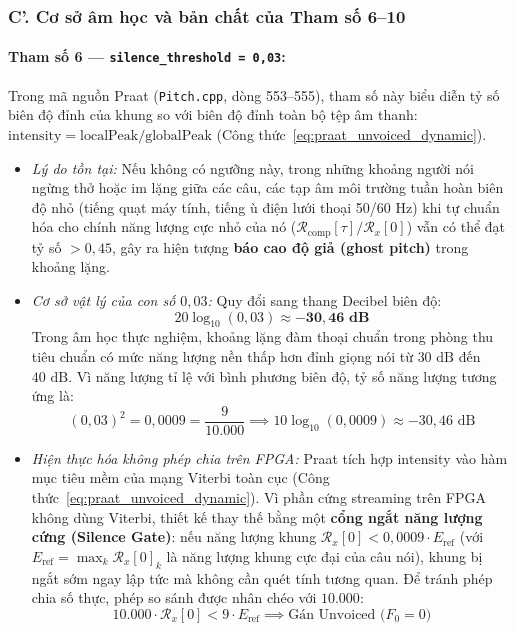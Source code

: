 \documentclass[11pt,a4paper]{article}
\begin{document}
\subsubsection*{C'. Cơ sở âm học và bản chất của Tham số 6--10}

\paragraph{Tham số 6 --- \texttt{silence\_threshold = 0,03}:}
Trong mã nguồn Praat (\texttt{Pitch.cpp}, dòng 553--555), tham số này biểu diễn tỷ số biên độ đỉnh của khung so với biên độ đỉnh toàn bộ tệp âm thanh: $\text{intensity} = \text{localPeak} / \text{globalPeak}$ (Công thức~\ref{eq:praat_unvoiced_dynamic}).
\begin{itemize}
    \setlength{\itemsep}{1pt}
    \item \emph{Lý do tồn tại:} Nếu không có ngưỡng này, trong những khoảng người nói ngừng thở hoặc im lặng giữa các câu, các tạp âm môi trường tuần hoàn biên độ nhỏ (tiếng quạt máy tính, tiếng ù điện lưới thoại 50/60 Hz) khi tự chuẩn hóa cho chính năng lượng cực nhỏ của nó ($\mathcal{R}_{\text{comp}}[\tau] / \mathcal{R}_x[0]$) vẫn có thể đạt tỷ số $> 0{,}45$, gây ra hiện tượng \textbf{báo cao độ giả (ghost pitch)} trong khoảng lặng.
    \item \emph{Cơ sở vật lý của con số $0{,}03$:} Quy đổi sang thang Decibel biên độ:
    \[
    20 \log_{10}(0{,}03) \approx \mathbf{-30{,}46\text{ dB}}
    \]
    Trong âm học thực nghiệm, khoảng lặng đàm thoại chuẩn trong phòng thu tiêu chuẩn có mức năng lượng nền thấp hơn đỉnh giọng nói từ $30\text{ dB}$ đến $40\text{ dB}$. Vì năng lượng tỉ lệ với bình phương biên độ, tỷ số năng lượng tương ứng là:
    \[
    (0{,}03)^2 = 0{,}0009 = \frac{9}{10.000} \implies 10 \log_{10}(0{,}0009) \approx -30{,}46\text{ dB}
    \]
    \item \emph{Hiện thực hóa không phép chia trên FPGA:} Praat tích hợp $\text{intensity}$ vào hàm mục tiêu mềm của mạng Viterbi toàn cục (Công thức~\ref{eq:praat_unvoiced_dynamic}). Vì phần cứng streaming trên FPGA không dùng Viterbi, thiết kế thay thế bằng một \textbf{cổng ngắt năng lượng cứng (Silence Gate)}: nếu năng lượng khung $\mathcal{R}_x[0] < 0{,}0009 \cdot E_{\text{ref}}$ (với $E_{\text{ref}} = \max_k \mathcal{R}_x[0]_k$ là năng lượng khung cực đại của câu nói), khung bị ngắt sớm ngay lập tức mà không cần quét tính tương quan. Để tránh phép chia số thực, phép so sánh được nhân chéo với $10.000$:
    \begin{equation}
    10.000 \cdot \mathcal{R}_x[0] < 9 \cdot E_{\text{ref}} \implies \text{Gán Unvoiced ($F_0 = 0$)}
    \label{eq:silence_gate_integer}
    \end{equation}
\end{itemize}
\end{document}
